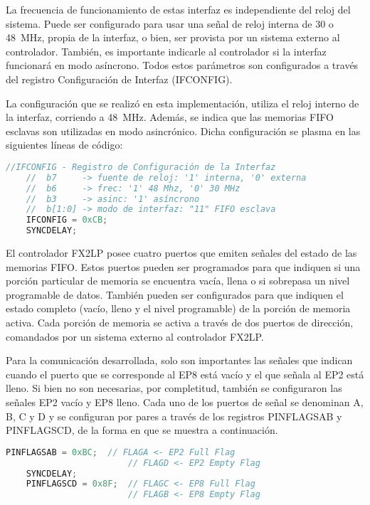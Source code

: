 	La frecuencia de funcionamiento de estas interfaz es independiente del reloj del sistema. Puede ser configurado para usar una señal de reloj interna de \si{30} o \SI{48}{\mega\hertz}, propia de la interfaz, o bien, ser provista por un sistema externo al controlador. También, es importante indicarle al controlador si la interfaz funcionará en modo asíncrono. Todos estos parámetros son configurados a través del registro Configuración de Interfaz (IFCONFIG).
	
	La configuración que se realizó en esta implementación, utiliza el reloj interno de la interfaz, corriendo a \SI{48}{\mega\hertz}. Además, se indica que las memorias FIFO esclavas son utilizadas en modo asincrónico. Dicha configuración se plasma en las siguientes líneas de código:
	
	\begin{lstlisting}[language=C,backgroundcolor=\color{gray!30}]
	//IFCONFIG - Registro de Configuración de la Interfaz
	//	b7 	   -> fuente de reloj: '1' interna, '0' externa
	//	b6 	   -> frec: '1' 48 Mhz, '0' 30 MHz
	//	b3 	   -> asinc: '1' asíncrono
	//	b[1:0] -> modo de interfaz: "11" FIFO esclava
	IFCONFIG = 0xCB;
	SYNCDELAY;
	\end{lstlisting}

	El controlador FX2LP posee cuatro puertos que emiten señales del estado de las memorias FIFO. Estos puertos pueden ser programados para que indiquen si una porción particular de memoria se encuentra vacía, llena o si sobrepasa un nivel programable de datos. También pueden ser configurados para que indiquen el estado completo (vacío, lleno y el nivel programable) de la porción de memoria activa. Cada porción de memoria se activa a través de dos puertos de dirección, comandados por un sistema externo al controlador FX2LP.
	
	Para la comunicación desarrollada, solo son importantes las señales que indican cuando el puerto que se corresponde al EP8 está vacío y el que señala al EP2 está lleno. Si bien no son necesarias, por completitud, también se configuraron las señales EP2 vacío y EP8 lleno. Cada uno de los puertos de señal se denominan A, B, C y D y se configuran por pares a través de los registros PINFLAGSAB y PINFLAGSCD, de la forma en que se muestra a continuación.
	
	\begin{lstlisting}[language=C,backgroundcolor=\color{gray!30}]
	PINFLAGSAB = 0xBC;	// FLAGA <- EP2 Full Flag
						// FLAGD <- EP2 Empty Flag
	SYNCDELAY;
	PINFLAGSCD = 0x8F;	// FLAGC <- EP8 Full Flag
						// FLAGB <- EP8 Empty Flag
	\end{lstlisting}
	
